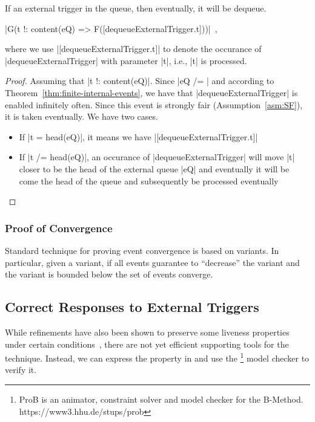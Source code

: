 \begin{theorem}
  If an external trigger in the queue, then eventually, it will be dequeue.
  \begin{center}
    |G(t !: content(eQ) => F([dequeueExternalTrigger.t]))|~,
  \end{center}
  where we use |[dequeueExternalTrigger.t]| to denote the occurance of
  |dequeueExternalTrigger| with parameter |t|, i.e., |t| is processed.
\end{theorem}
\begin{proof}
  Assuming that |t !: content(eQ)|. Since |eQ /= {}| and according to
  Theorem~\ref{thm:finite-internal-events}, we have that
  |dequeueExternalTrigger| is enabled infinitely often.  Since this
  event is strongly fair (Assumption~\ref{asm:SF}), it is taken
  eventually. We have two cases.
  \begin{itemize}
  \item If |t = head(eQ)|, it means we have
    |[dequeueExternalTrigger.t]|
    
  \item If |t /= head(eQ)|, an occurance of |dequeueExternalTrigger|
    will move |t| closer to be the head of the external queue |eQ| and
    eventually it will be come the head of the queue and subsequently
    be processed eventually
  \end{itemize}
\end{proof}

\subsubsection{Proof of Convergence}
\label{sec:proof-convergence}

Standard technique for proving event convergence is based on
variants.  In particular, given a variant, if all events guarantee to
``decrease'' the variant and the variant is bounded below the set of
events converge.




\subsection{Correct Responses to External Triggers}
\label{sec:corr-resp-extern}

While \EventB refinements have also been shown to preserve some liveness properties under certain conditions~\cite{hoang2016ltl}, there are not yet efficient supporting tools for the technique.%
Instead, we can express the property in \LTL  and use the \PROB\footnote{ProB is an animator, constraint solver and model checker for the B-Method. https://www3.hhu.de/stups/prob} model checker to verify it.

